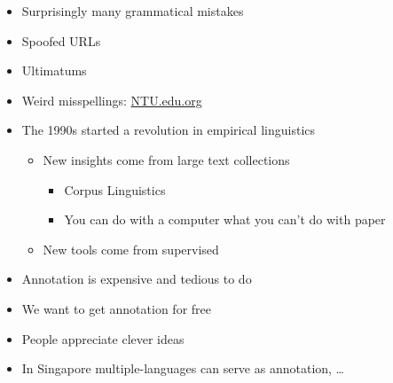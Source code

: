 \documentclass[a4paper,landscape,headrule,footrule,xetex]{foils}
\begin{document}

\begin{itemize}
\item Surprisingly many grammatical mistakes
\item Spoofed URLs
\item Ultimatums
\item Weird misspellings: \url{NTU.edu.org}
\end{itemize}


\MyLogo{}
\begin{itemize}
\item The 1990s started a revolution in empirical linguistics
  \begin{itemize}
  \item New insights come from  large text collections
    \begin{itemize}
    \item Corpus Linguistics
    \item You can do with a computer what you can't do with paper
    \end{itemize}
  \item New tools come from supervised 
  \end{itemize}
\item Annotation is expensive and tedious to do
\item We want to get annotation for free
\item People appreciate clever ideas
\item In Singapore multiple-languages can serve as annotation, \ldots
\end{itemize}


\end{document}
